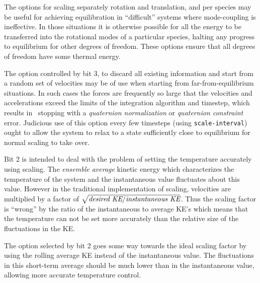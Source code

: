 The options for scaling separately rotation and translation, and per
species may be useful for achieving equilibration in ``difficult''
systems where mode-coupling is ineffective.  In those situations it is
otherwise possible for all the energy to be transferred into the
rotational modes of a particular species, halting any progress to
equilibrium for other degrees of freedom.   These options ensure that
all degrees of freedom have some thermal energy.

The option controlled by bit 3, to discard all existing information
and start from a random set of velocities may be of use when starting
from far-from-equilibrium situations.  In such cases the forces
are frequently so large that the velocities and accelerations exceed
the limits of the integration algorithm and timestep, which results in
\moldy\ stopping with a {\em quaternion normalization} or {\em
quaternion constraint} error.  Judicious use of this option every few
timesteps (using \verb'scale-interval') ought to allow the system to
relax to a state sufficiently close to equilibrium for normal scaling
to take over.

Bit 2 is intended to deal with the problem of setting the temperature
accurately using scaling.  The {\em ensemble average} kinetic energy
which characterizes the temperature of the system and the
instantaneous value fluctuates about this value.  However in the
traditional implementation of scaling, velocities are multiplied by a
factor of $\sqrt{\mbox{\em desired KE} / \mbox{\em instantaneous
KE}}$.  Thus the scaling factor is ``wrong'' by the ratio of the
instantaneous to average KE's which means that the temperature can not
be set more accurately than the relative size of the fluctuations in
the KE.  

The option selected by bit 2 goes some way towards the ideal scaling
factor by using the rolling average KE instead of the instantaneous
value.  The fluctuations in this short-term average should be much
lower than in the instantaneous value, allowing more accurate
temperature control. 

